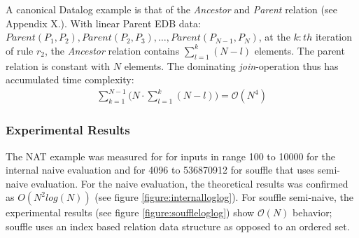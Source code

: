 A canonical Datalog example is that of the \textit{Ancestor} and \textit{Parent} relation (see Appendix X.). With linear Parent EDB data: $Parent(P_1, P_2), Parent(P_2, P_3), \ldots, Parent(P_{N-1}, P_N)$, at the $k:th$ iteration of rule $r_2$, the \textit{Ancestor} relation contains $\sum_{l = 1}^{k} (N - l)$ elements. The parent relation is constant with $N$ elements. The dominating \textit{join}-operation thus has accumulated time complexity:
\begin{align*}
\sum_{k = 1}^{N - 1} \Big (N \cdot \sum_{l = 1}^{k} (N - l)\Big) = \mathcal{O}(N^4)
\end{align*}

\subsubsection{Experimental Results}
The NAT example was measured for for inputs in range 100 to 10000 for the internal naive evaluation and for 4096 to 536870912 for souffle that uses semi-naive evaluation. For the naive evaluation, the theoretical results was confirmed as $O(N^2 log(N))$ (see figure \ref{figure:internalloglog}). For souffle semi-naive, the experimental results (see figure \ref{figure:souffleloglog}) show $\mathcal{O}(N)$ behavior; souffle uses an index based relation data structure as opposed to an ordered set.
